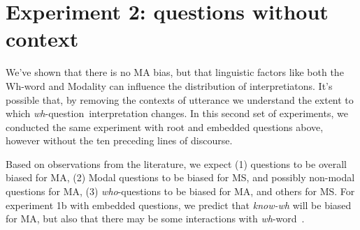 \documentclass[12pt,letterpaper,table,svgnames,dvipsnames]{article}
\newcommand{\mm}[1]{\textcolor{teal}{[mm: #1]}}
\newcommand{\whq}{\emph{wh}-question~}
\newcommand{\whw}{\emph{wh}-word~}
\begin{document}
















\section{Experiment 2: questions without context}
We've shown that there is no MA bias, but that linguistic factors like both the Wh-word and Modality can influence the distribution of interpretiatons. It's possible that, by removing the contexts of utterance we understand the extent to which \whq interpretation changes. In this second set of experiments, we conducted the same experiment with root and embedded questions above, however without the ten preceding lines of discourse.

Based on observations from the literature, we expect (1) questions to be overall biased for MA, (2) Modal questions to be biased for MS, and possibly non-modal questions for MA, (3) \emph{who}-questions to be biased for MA, and others for MS. For experiment 1b with embedded questions, we predict that \emph{know-wh} will be biased for MA, but also that there may be some interactions with \whw.
\end{document}
